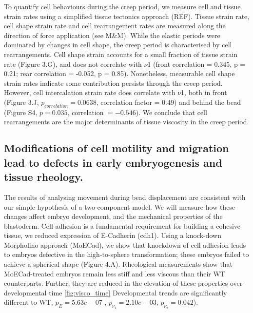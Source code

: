 To quantify cell behaviours during the creep period, we measure cell and tissue strain rates using a simplified tissue tectonics approach (REF).
Tissue strain rate, cell shape strain rate and cell rearrangement rates are measured along the direction of force application (see M\&M).
While the elastic periods were dominated by changes in cell shape, the creep period is characterised by cell rearrangements.
Cell shape strain accounts for a small fraction of tissue strain rate (Figure 3.G), and does not correlate with $\nu$1 (front correlation = 0.345, p = 0.21; rear correlation = -0.052, p = 0.85).
Nonetheless, measurable cell shape strain rates indicate some contribution persists through the creep period.
However, cell intercalation strain rate does correlate with $\nu$1, both in front (Figure 3.J, $p_{correlation} = 0.0638$, correlation factor = 0.49) and behind the bead (Figure S4, $p = 0.035$, correlation $= -0.546$).
We conclude that cell rearrangements are the major determinants of tissue viscosity in the creep period.


\subsection{Modifications of cell motility and migration lead to defects in early embryogenesis and tissue rheology.}

The results of analysing %
movement during bead displacement are consistent with our simple hypothesis of a two-component model.
We will measure how these changes affect embryo development, %
and the mechanical properties of the blastoderm.
Cell adhesion is a fundamental requirement for building a cohesive tissue, we reduced expression of E-Cadherin (cdh1).
Using a knock-down Morpholino approach (MoECad), we show that knockdown of cell adhesion leads to embryos defective in the high-to-sphere transformation; these embryos failed to achieve a spherical shape (Figure 4.A).
Rheological measurements show that MoECad-treated embryos remain less stiff and less viscous than their WT counterparts.
Further, they are reduced in the elevation of these properties over developmental time \ref{fig:visco_time}
Developmental trends are significantly different to WT, $p_E = 5.63e-07$ , $p_{\nu_1} = 2.10e-03$, $p_{\nu_2} =0.042$).

